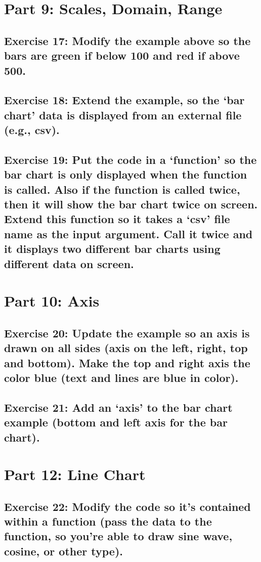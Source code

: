 \documentclass[11pt]{article}   	%
\begin{document}
\section{Part 9: Scales, Domain, Range}
\subsection{Exercise 17: Modify the example above so the bars are green if below 100 and red if above 500.}
\subsection{Exercise 18: Extend the example, so the ‘bar chart’ data is displayed from an external file (e.g., csv).}
\subsection{Exercise 19: Put the code in a ‘function’ so the bar chart is only displayed when the function is called. Also if the function is called twice, then it will show the bar chart twice on screen. Extend this function so it takes a ‘csv’ file name as the input argument. Call it twice and it displays two different bar charts using different data on screen.}

\section{Part 10: Axis}
\subsection{Exercise 20: Update the example so an axis is drawn on all sides (axis on the left, right, top and bottom). Make the top and right axis the color blue (text and lines are blue in color).}
\subsection{Exercise 21: Add an ‘axis’ to the bar chart example (bottom and left axis for the bar chart).}

\section{Part 12: Line Chart }
\subsection{ Exercise 22: Modify the code so it’s contained within a function (pass the data to the function, so you’re able to draw sine wave, cosine, or other type).}
\end{document}
